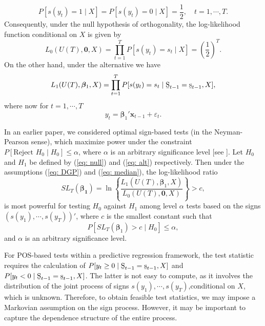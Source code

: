 \documentclass[harvard,11pt]{article}
\begin{document}
\begin{equation}
P[s(y_t)=1\mid X]=P[s(y_t)=0\mid X]=\frac{1}{2},\quad t=1,\cdots,T.
\end{equation}
Consequently, under the null hypothesis of orthogonality, the log-likelihood function conditional on $X$ is given by
\[
L_0(U(T),\bm{0},X)=\prod\limits_{t=1}^{T}P[s(y_t)=s_t\mid X]=\left(\frac{1}{2}\right)^T.
\]
On the other hand, under the alternative we have
\[
L_1(U(T),\bm{\beta}_1,X)=\prod\limits_{t=1}^{T}P[s(y_t)=s_t\mid \text{\b{S}}_{t-1}=\text{\b{s}}_{t-1}, X],
\]
where now for $t=1,\cdots,T$
\[
y_t=\bm{\beta}_1'\bm{x}_{t-1}+\varepsilon_t.
\]

In an earlier paper, we considered optimal sign-based tests (in the Neyman-Pearson sense), which maximize power under the constraint $P[\text{Reject }  H_0\mid H_0]\leq \alpha$, where $\alpha$ is an arbitrary significance level [see \citet{lehmann2006testing}]. Let $H_0$ and $H_1$ be defined by (\ref{eq: null}) and (\ref{eq: alt}) respectively. Then under the assumptions (\ref{eq: DGP}) and (\ref{eq: median}), the log-likelihood ratio
\begin{equation}\label{eq: teststat}
SL_T(\bm{\beta_1})=\ln\left\{\frac{L_1(U(T),\bm{\beta}_1,X)}{L_0(U(T),\bm{0},X)}\right\}>c,
\end{equation} 
is most powerful for testing $H_0$ against $H_1$ among level $\alpha$ tests based on the signs $(s(y_1),\cdots,s(y_T))'$, where $c$ is the smallest constant such that 
\[
P[SL_T(\bm{\beta}_1)>c\mid H_0]\leq \alpha,
\]
and $\alpha$ is an arbitrary significance level.

 For POS-based tests within a predictive regression framework, the test statistic requires the calculation of $P[y_t\geq0\mid\text{\b{S}}_{t-1}=\text{\b{s}}_{t-1},X]$ and $P[y_t<0\mid\text{\b{S}}_{t-1}=\text{\b{s}}_{t-1},X]$. The latter is not easy to compute, as it involves the distribution of the joint process of signs  $s(y_1),\cdots,s(y_T)$,conditional on $X$, which is unknown. Therefore, to obtain feasible test statistics, we may impose a Markovian assumption on the sign process. However, it may be important to capture the dependence structure of the entire process.
\end{document}
